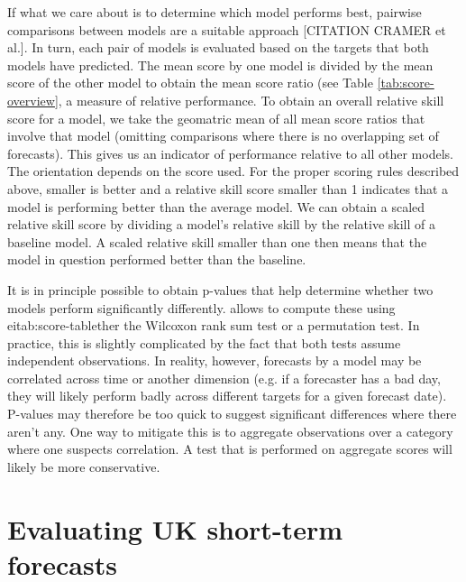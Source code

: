 \documentclass[article,shortnames]{jss}\usepackage[]{graphicx}\usepackage[]{color}
\begin{document}
If what we care about is to determine which model performs best, pairwise comparisons between models are a suitable approach [CITATION CRAMER et al.]. In turn, each pair of models is evaluated based on the targets that both models have predicted. The mean score by one model is divided by the mean score of the other model to obtain the mean score ratio (see Table \ref{tab:score-overview}, a measure of relative performance. To obtain an overall relative skill score for a model, we take the geomatric mean of all mean score ratios that involve that model  (omitting comparisons where there is no overlapping set of forecasts). This gives us an indicator of performance relative to all other models. The orientation depends on the score used. For the proper scoring rules described above, smaller is better and a relative skill score smaller than 1 indicates that a model is performing better than the average model. We can obtain a scaled relative skill score by dividing a model's relative skill by the relative skill of a baseline model. A scaled relative skill smaller than one then means that the model in question performed better than the baseline. 

It is in principle possible to obtain p-values that help determine whether two models perform significantly differently.  allows to compute these using eitab:score-tablether the Wilcoxon rank sum test or a permutation test. In practice, this is slightly complicated by the fact that both tests assume independent observations. In reality, however, forecasts by a model may be correlated across time or another dimension (e.g. if a forecaster has a bad day, they will likely perform badly across different targets for a given forecast date). P-values may therefore be too quick to suggest significant differences where there aren't any. One way to mitigate this is to aggregate observations over a category where one suspects correlation. A test that is performed on aggregate scores will likely be more conservative. 



\section{Evaluating UK short-term forecasts}

\end{document}
